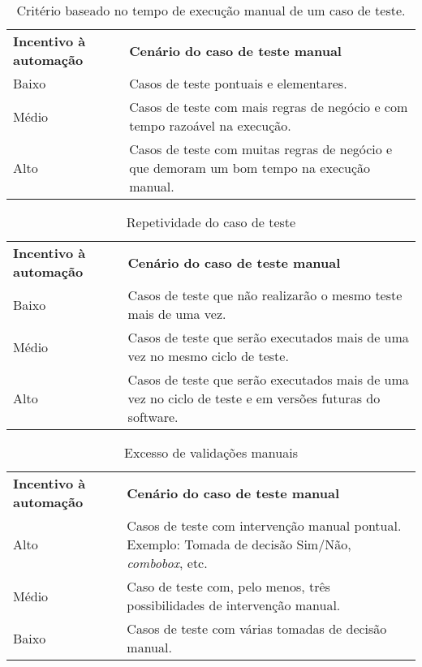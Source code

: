 \begin{table}[H]
\centering
\caption{Critério baseado no tempo de execução manual de um caso de teste.}
\label{tab:3.8}
\begin{tabular}{|p{50mm}|p{80mm}|}
\cline{1-2}
\textbf{Incentivo à automação} & \textbf{Cenário do caso de teste manual}\\ 
    \cline{1-2}
    Baixo & Casos de teste pontuais e elementares. \\
    \cline{1-2}
    Médio & Casos de teste com mais regras de negócio e com tempo razoável na execução.\\
    \cline{1-2}
    Alto & Casos de teste com muitas regras de negócio e que demoram um bom tempo na execução manual.\\
    \cline{1-2}
\end{tabular}
\end{table}

\begin{table}[H]
\centering
\caption{Repetividade do caso de teste}
\label{tab:3.9}
\begin{tabular}{|p{50mm}|p{80mm}|}
\cline{1-2}
\textbf{Incentivo à automação} & \textbf{Cenário do caso de teste manual}\\
    \cline{1-2}
    Baixo & Casos de teste que não realizarão o mesmo teste mais de uma vez.\\
    \cline{1-2}
    Médio & Casos de teste que serão executados mais de uma vez no mesmo ciclo de teste.\\
    \cline{1-2}
    Alto & Casos de teste que serão executados mais de uma vez no ciclo de teste e em versões futuras do software.\\
    \cline{1-2}
\end{tabular}
\end{table}

\begin{table}[H]
\centering
\caption{Excesso de validações manuais}
\label{tab:3.10}
\begin{tabular}{|p{50mm}|p{80mm}|}
\cline{1-2}
\textbf{Incentivo à automação} & \textbf{Cenário do caso de teste manual} \\
    \cline{1-2}
    Alto & Casos de teste com intervenção manual pontual. Exemplo: Tomada de decisão Sim/Não, \textit{combobox}, etc.\\ 
    \cline{1-2}
    Médio & Caso de teste com, pelo menos, três possibilidades de intervenção manual.\\
    \cline{1-2}
    Baixo & Casos de teste com várias tomadas de decisão manual. \\
    \cline{1-2}
\end{tabular}
\end{table}

